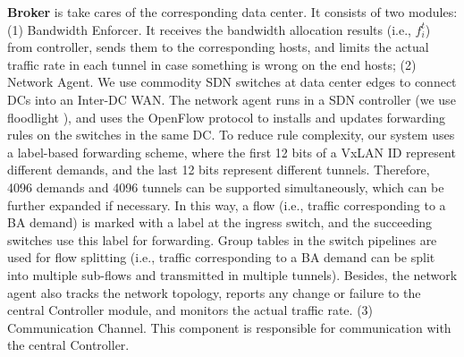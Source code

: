 \documentclass[sigconf]{acmart}
\begin{document}
\textbf{Broker} is take cares of the corresponding data center. It consists of  two modules:
(1) Bandwidth Enforcer.
It receives the bandwidth allocation results (i.e., $f_i^t$) from controller, sends them to the corresponding hosts, and limits the actual traffic rate in each tunnel in case something is wrong on the end hosts;
(2) Network Agent.
We use commodity SDN switches at data center edges to connect DCs into an Inter-DC WAN.
The network agent runs in a SDN controller (we use floodlight \cite{floodlight}), 
and uses the OpenFlow \cite{openflow} protocol to installs and updates forwarding rules 
on the switches in the same DC. 
To reduce rule complexity, our system uses a label-based forwarding scheme, 
where the first 12 bits of a VxLAN ID represent different demands, 
and the last 12 bits represent different tunnels.
Therefore, 4096 demands and 4096 tunnels can be supported simultaneously, 
which can be further expanded if necessary. 
In this way, a flow (i.e., traffic corresponding to a BA demand) is marked with a label at the ingress switch, and the succeeding switches use this label for forwarding.
Group tables in the switch pipelines are used for flow splitting (i.e., traffic corresponding to a BA demand 
can be split into multiple sub-flows and transmitted in multiple tunnels).
Besides, the network agent also tracks the network topology, reports any change or failure to the central Controller module, and monitors the actual traffic rate. 
(3) Communication Channel.
This component is responsible for communication with the central Controller.
\end{document}
